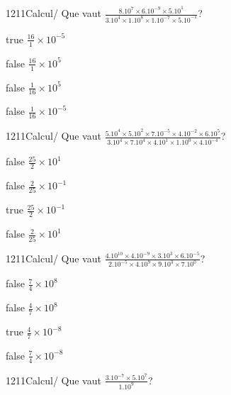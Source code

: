             \begin{question}{1211}{Calcul}{}{/}
                Que vaut $\frac{8.10^{7}\times 6.10^{-9}\times 5.10^{1}}{3.10^{4}\times 1.10^{8}\times 1.10^{-7}\times 5.10^{-1}}$?
            \end{question}
            \begin{reponses}
                \item[true] $\frac{16}{1}\times 10^{-5}$
                \item[false] $\frac{16}{1}\times 10^{5}$
                \item[false] $\frac{1}{16}\times 10^{5}$
                \item[false] $\frac{1}{16}\times 10^{-5}$
            \end{reponses}
            \begin{question}{1211}{Calcul}{}{/}
                Que vaut $\frac{5.10^{4}\times 5.10^{2}\times 7.10^{-5}\times 4.10^{-2}\times 6.10^{5}}{3.10^{4}\times 7.10^{4}\times 4.10^{1}\times 1.10^{0}\times 4.10^{-4}}$?
            \end{question}
            \begin{reponses}
                \item[false] $\frac{25}{2}\times 10^{1}$
                \item[false] $\frac{2}{25}\times 10^{-1}$
                \item[true] $\frac{25}{2}\times 10^{-1}$
                \item[false] $\frac{2}{25}\times 10^{1}$
            \end{reponses}
            \begin{question}{1211}{Calcul}{}{/}
                Que vaut $\frac{4.10^{10}\times 4.10^{-9}\times 3.10^{3}\times 6.10^{-5}}{2.10^{-5}\times 4.10^{9}\times 9.10^{3}\times 7.10^{0}}$?
            \end{question}
            \begin{reponses}
                \item[false] $\frac{7}{4}\times 10^{8}$
                \item[false] $\frac{4}{7}\times 10^{8}$
                \item[true] $\frac{4}{7}\times 10^{-8}$
                \item[false] $\frac{7}{4}\times 10^{-8}$
            \end{reponses}
            \begin{question}{1211}{Calcul}{}{/}
                Que vaut $\frac{3.10^{-7}\times 5.10^{7}}{1.10^{9}}$?
            \end{question}
